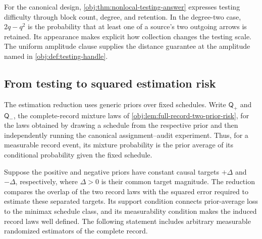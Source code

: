 \documentclass[11pt]{article}
\begin{document}
For the canonical design, \cref{obj:thm:nonlocal-testing-answer} expresses testing difficulty through block count, degree, and retention. In the degree-two case, \(2q-q^2\) is the probability that at least one of a source's two outgoing arrows is retained. Its appearance makes explicit how collection changes the testing scale. The uniform amplitude clause supplies the distance guarantee at the amplitude named in \cref{obj:def:testing-handle}.

\subsection{From testing to squared estimation risk}

The estimation reduction uses generic priors over fixed schedules. Write \(\mathsf Q_+\) and \(\mathsf Q_-\), the complete-record mixture laws of \cref{obj:lem:full-record-two-prior-risk}, for the laws obtained by drawing a schedule from the respective prior and then independently running the canonical assignment--audit experiment. Thus, for a measurable record event, its mixture probability is the prior average of its conditional probability given the fixed schedule.

Suppose the positive and negative priors have constant causal targets \(+\Delta\) and \(-\Delta\), respectively, where \(\Delta>0\) is their common target magnitude. The reduction compares the overlap of the two record laws with the squared error required to estimate these separated targets. Its support condition connects prior-average loss to the minimax schedule class, and its measurability condition makes the induced record laws well defined. The following statement includes arbitrary measurable randomized estimators of the complete record.
\end{document}

